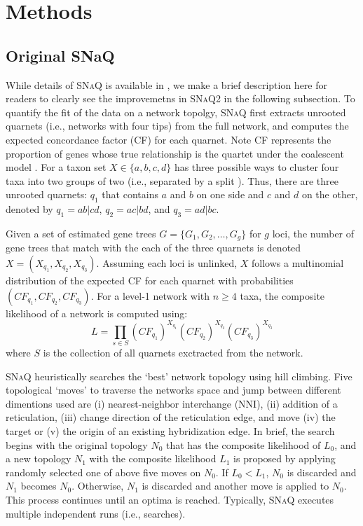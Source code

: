 \documentclass[unnumsec,webpdf,contemporary,large]{oup-authoring-template}%
\theoremstyle{thmstyleone}%
\theoremstyle{thmstyletwo}%
\theoremstyle{thmstylethree}%
\begin{document}
\pagebreak
\section{Methods}\label{sec2}
\subsection{Original SNaQ}\label{subsec1}
While details of \textsc{SNaQ} is available in \cite{solis-lemus2016}, we make a brief description here for readers to clearly see the improvemetns in \textsc{SNaQ2} in the following subsection. To quantify the fit of the data on a network topolgy, \textsc{SNaQ} first extracts unrooted quarnets (i.e., networks with four tips) from the full network, and computes the expected concordance factor (CF) for each quarnet. Note CF represents the proportion of genes whose true relationship is the quartet under the coalescent model \citep{baum2007}. For a taxon set $X\in\{a,b,c,d\}$ has three possible ways to cluster four taxa into two groups of two (i.e., separated by a split \citep{chifman2014}). Thus, there are three unrooted quarnets: $q_1$ that contains $a$ and $b$ on one side and $c$ and $d$ on the other, denoted by $q_1=ab|cd$, $q_2=ac|bd$, and $q_3=ad|bc$.

Given a set of estimated gene trees $G=\{G_1,G_2,\dots,G_g\}$ for $g$ loci, the number of gene trees that match with the each of the three quarnets is denoted $X=(X_{q_1},X_{q_2},X_{q_3})$. Assuming each loci is unlinked, $X$ follows a multinomial distribution of the expected CF for each quarnet with probabilities $(CF_{q_1},CF_{q_2},CF_{q_3})$. For a level-1 network with $n\ge4$ taxa, the composite likelihood of a network is computed using:
\begin{equation}
    L=\prod_{s \in S}(CF_{q_1})^{X_{q_1}}(CF_{q_2})^{X_{q_2}}(CF_{q_3})^{X_{q_3}}
\label{eqn1}
\end{equation}
\noindent where $S$ is the collection of all quarnets exctracted from the network.

\textsc{SNaQ} heuristically searches the `best' network topology using hill climbing. Five topological `moves' to traverse the networks space and jump between different dimentions used are (i) nearest-neighbor interchange (NNI), (ii) addition of a reticulation, (iii) change direction of the reticulation edge, and move (iv) the target or (v) the origin of an existing hybridization edge. In brief, the search begins with the original topology $N_0$ that has the composite likelihood of $L_0$, and a new topology $N_1$ with the composite likelihood $L_1$ is proposed by applying randomly selected one of above five moves on $N_0$. If $L_0 < L_1$, $N_0$ is discarded and $N_1$ becomes $N_0$. Otherwise, $N_1$ is discarded and another move is applied to $N_0$. This process continues until an optima is reached. Typically, \textsc{SNaQ} executes multiple independent runs (i.e., searches). 
\end{document}
